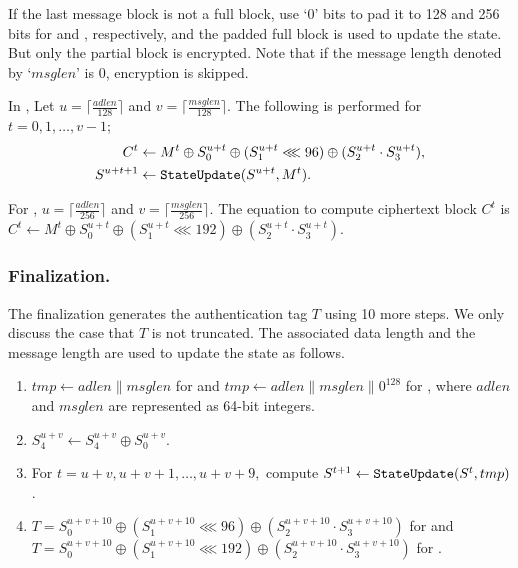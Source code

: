 \documentclass{llncs}
\begin{document}
If the last message block is not a full block, use `0' bits to pad it to 128 and 256 bits for  and , respectively, and the padded full block is used to update the state. But only the partial block is encrypted. Note that if the message length denoted by `$msglen$' is 0, encryption is skipped.

In , Let $u = \lceil \frac{adlen}{128} \rceil$ and $v = \lceil \frac{msglen}{128} \rceil$. The following is performed for $t=0, 1, \ldots, v-1$;
\begin{align*}
C^t &\leftarrow M^t \oplus S^{u+t}_0 \oplus (S^{u+t}_1 \lll 96) \oplus (S^{u+t}_2 \cdot S^{u+t}_3),\\
S^{u+t+1} &\leftarrow {\tt StateUpdate}(S^{u+t},M^t).
\end{align*}

For , $u = \lceil \frac{adlen}{256} \rceil$ and $v = \lceil \frac{msglen}{256} \rceil$. The equation to compute ciphertext block $C^t$ is $C^t \leftarrow M^t \oplus S^{u+t}_0 \oplus (S^{u+t}_1 \lll 192) \oplus (S^{u+t}_2 \cdot S^{u+t}_3)$.

\subsubsection{Finalization.}
The finalization generates the authentication tag $T$ using 10 more steps. We only discuss the case that $T$ is not truncated. The associated data length and the message length are used to update the state as follows.
\begin{enumerate}
\item $tmp \leftarrow adlen\|msglen$ for  and $tmp \leftarrow adlen\|msglen\|0^{128}$ for , where $adlen$ and $msglen$ are represented as 64-bit integers.
\item $S^{u+v}_4 \leftarrow S^{u+v}_4 \oplus S^{u+v}_0.$
\item For $t = u+v, u+v+1, \ldots, u+v+9,$ compute
$S^{t+1} \leftarrow {\tt StateUpdate} (S^t, tmp)$.
\item $T = S^{u+v+10}_0 \oplus (S^{u+v+10}_1 \lll 96) \oplus ( S^{u+v+10}_2 \cdot S^{u+v+10}_3)$ for  and $T = S^{u+v+10}_0 \oplus (S^{u+v+10}_1 \lll 192) \oplus ( S^{u+v+10}_2 \cdot S^{u+v+10}_3)$ for .
\end{enumerate}
\end{document}
